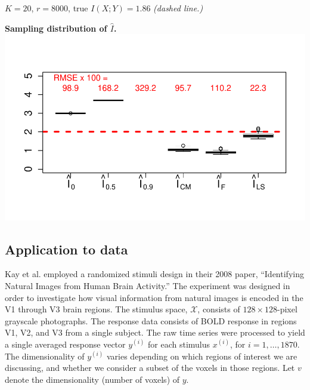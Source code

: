 \documentclass[12pt]{article}
\begin{document}
$K=20$, $r = 8000$, true $I(X; Y) = 1.86$ \emph{(dashed line.)}

\begin{center}
\textbf{Sampling distribution of $\hat{I}$.}
\includegraphics[scale = 0.6, clip = true, trim = 0 0.5in 0 0.5in]{../info_theory_sims/fig6.pdf}
\end{center}

\subsection{Application to data}

Kay et al. employed a randomized stimuli design in their 2008 paper,
``Identifying Natural Images from Human Brain Activity.''  The
experiment was designed in order to investigate how visual information
from natural images is encoded in the V1 through V3 brain regions.
The stimulus space, $\mathcal{X}$, consists of $128 \times 128$-pixel
grayscale photographs.  The response data consists of BOLD response in
regions V1, V2, and V3 from a single subject.  The raw time series were
processed to yield a single averaged response vector $y^{(i)}$ for each
stimulus $x^{(i)}$, for $i = 1,\hdots, 1870$.
The dimensionality of $y^{(i)}$ varies depending on which regions of interest
we are discussing, and whether we consider a subset of the voxels in those regions.
Let $v$ denote the dimensionality (number of voxels) of $y$.
\end{document}
